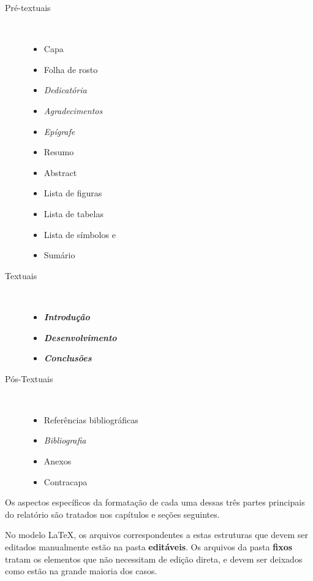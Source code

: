 \begin{description}
    \item [Pré-textuais] \

        \begin{itemize}
            \item Capa
            \item Folha de rosto
            \item \textit{Dedicatória}
            \item \textit{Agradecimentos}
            \item \textit{Epígrafe}
            \item Resumo
            \item Abstract
            \item Lista de figuras
            \item Lista de tabelas
            \item Lista de símbolos e
            \item Sumário
        \end{itemize}

    \item [Textuais] \

        \begin{itemize}
            \item \textbf{\textit{Introdução}}
            \item \textbf{\textit{Desenvolvimento}}
            \item \textbf{\textit{Conclusões}}
        \end{itemize}

    \item [Pós-Textuais] \

        \begin{itemize}
            \item Referências bibliográficas
            \item \textit{Bibliografia}
            \item Anexos
            \item Contracapa
        \end{itemize}
\end{description}

Os aspectos específicos da formatação de cada uma dessas três partes 
principais do relatório são tratados nos capítulos e seções seguintes.

No modelo \LaTeX, os arquivos correspondentes a estas estruturas que devem
ser editados manualmente estão na pasta \textbf{editáveis}. Os arquivos
da pasta \textbf{fixos} tratam os elementos que não necessitam de 
edição direta, e devem ser deixados como estão na grande maioria dos casos.

